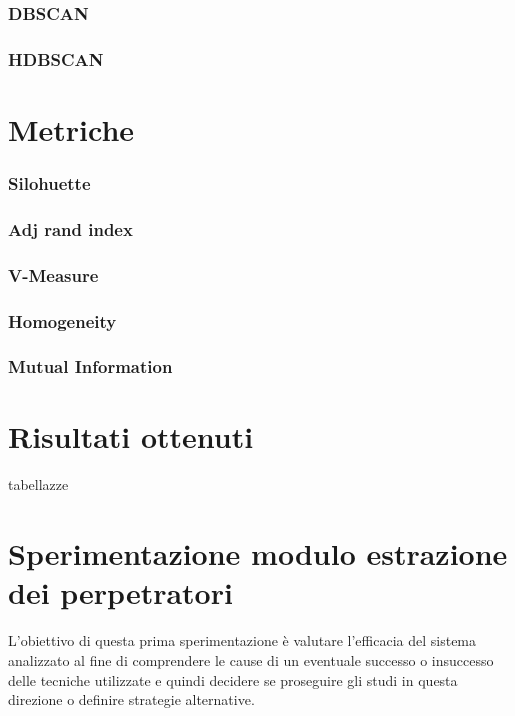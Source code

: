 \subsubsection{DBSCAN}
\subsubsection{HDBSCAN}

\section{Metriche}
\subsubsection{Silohuette}
\subsubsection{Adj rand index}
\subsubsection{V-Measure}
\subsubsection{Homogeneity}
\subsubsection{Mutual Information}



\section{Risultati ottenuti}
tabellazze

\section{Sperimentazione modulo estrazione dei perpetratori}
L'obiettivo di questa prima sperimentazione è valutare l'efficacia del sistema analizzato al fine di comprendere le cause di un eventuale successo o insuccesso delle tecniche utilizzate e quindi decidere se proseguire gli studi in questa direzione o definire strategie alternative.

